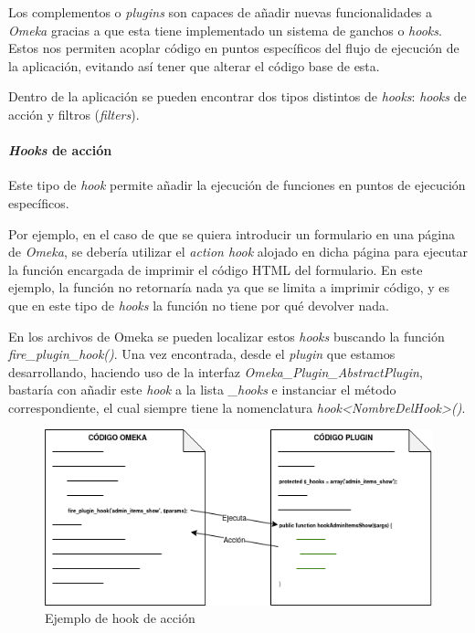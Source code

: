 \documentclass[
]{article}
\begin{document}
Los complementos o \emph{plugins} son capaces de añadir nuevas
funcionalidades a \emph{Omeka} gracias a que esta tiene implementado un
sistema de ganchos o \emph{hooks}. Estos nos permiten acoplar código en
puntos específicos del flujo de ejecución de la aplicación, evitando así
tener que alterar el código base de esta.

Dentro de la aplicación se pueden encontrar dos tipos distintos de
\emph{hooks}: \emph{hooks} de acción y filtros (\emph{filters}).

\hypertarget{hooks-de-acciuxf3n}{%
\paragraph{\texorpdfstring{\emph{Hooks} de
acción}{Hooks de acción}}\label{hooks-de-acciuxf3n}}

Este tipo de \emph{hook} permite añadir la ejecución de funciones en
puntos de ejecución específicos.

Por ejemplo, en el caso de que se quiera introducir un formulario en una
página de \emph{Omeka}, se debería utilizar el \emph{action hook}
alojado en dicha página para ejecutar la función encargada de imprimir
el código HTML del formulario. En este ejemplo, la función no retornaría
nada ya que se limita a imprimir código, y es que en este tipo de
\emph{hooks} la función no tiene por qué devolver nada.

En los archivos de Omeka se pueden localizar estos \emph{hooks} buscando
la función \emph{fire\_plugin\_hook()}. Una vez encontrada, desde el
\emph{plugin} que estamos desarrollando, haciendo uso de la interfaz
\emph{Omeka\_Plugin\_AbstractPlugin}, bastaría con añadir este
\emph{hook} a la lista \emph{\_hooks} e instanciar el método
correspondiente, el cual siempre tiene la nomenclatura
\emph{hook\textless NombreDelHook\textgreater()}.

\begin{figure}
\hypertarget{actionhooks}{%
\centering
\includegraphics{../_static/images/actionhooks.png}
\caption{Ejemplo de hook de acción}\label{actionhooks}
}
\end{figure}
\end{document}
